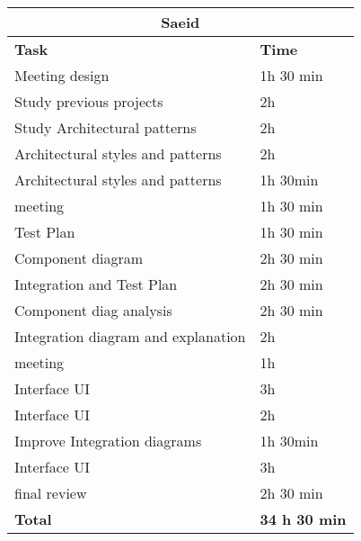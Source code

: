 \begin{table}[H]
\begin{tabular}{|l|l|}
\hline
\multicolumn{2}{|c|}{\textbf{Saeid}}            \\ \hline
\textbf{Task}                   & \textbf{Time} \\ \hline
Meeting design & 1h 30 min \\ \hline
Study previous projects & 2h \\ \hline
Study Architectural  patterns & 2h \\ \hline
Architectural styles and patterns & 2h \\ \hline
Architectural styles and patterns & 1h 30min \\ \hline
meeting & 1h  30 min \\ \hline
Test Plan & 1h  30 min \\ \hline
Component diagram & 2h  30 min \\ \hline
Integration and Test Plan & 2h  30 min \\ \hline
Component diag analysis & 2h  30 min \\ \hline
Integration diagram and explanation & 2h \\ \hline
meeting & 1h \\ \hline
Interface UI & 3h \\ \hline
Interface UI & 2h \\ \hline
Improve Integration diagrams & 1h 30min \\ \hline
Interface UI & 3h \\ \hline
final review & 2h 30 min \\ \hline
\rowcolor {polilight}
\textbf{Total}                  & \textbf{34 h 30 min}   \\ \hline
\end{tabular}
\end{table}
